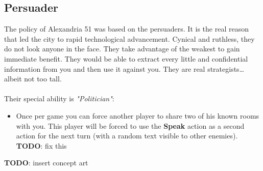 \subsection{Persuader}

The policy of Alexandria 51 was based on the persuaders. It is the real reason that led the city to rapid technological advancement. Cynical and ruthless, they do not look anyone in the face. They take advantage of the weakest to gain immediate benefit. They would be able to extract every little and confidential information from you and then use it against you. They are real strategists… albeit not too tall.\\\\
Their special ability is \textit{"Politician"}:
\begin{itemize}
\item Once per game you can force another player to share two of his known rooms with you. This player will be forced to use the \textbf{Speak} action as a second action for the next turn (with a random text visible to other enemies). \textbf{TODO}: fix this
\end{itemize}
\textbf{TODO}: insert concept art